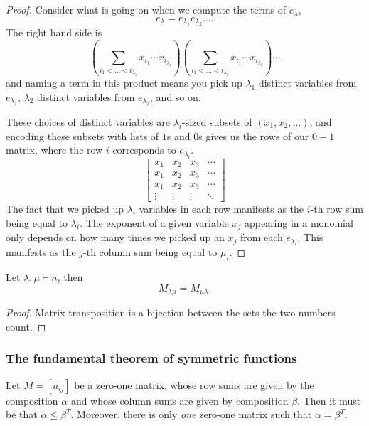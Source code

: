 \documentclass{article}
\begin{document}
\begin{proof}

    Consider what is going on when we compute the terms of $e_\lambda$,
    \[
        e_\lambda = e_{\lambda_1}e_{\lambda_2}\ldots.
    \]
    The right hand side is
    \[
        \left(\sum_{i_1<\ldots<i_{\lambda_1}} x_{i_1}\cdots x_{i_{\lambda_1}}\right)\left(\sum_{i_1<\ldots<i_{\lambda_2}} x_{i_1}\cdots x_{i_{\lambda_2}}\right)\cdots
    \]
    and naming a term in this product means you pick up $\lambda_1$ distinct variables from $e_{\lambda_1}$, $\lambda_2$ distinct variables from $e_{\lambda_2}$, and so on. 
    
    These choices of distinct variables are $\lambda_i$-sized subsets of $(x_1, x_2, \ldots)$, and encoding these subsets with lists of $1$s and $0$s gives us the rows of our $0-1$ matrix, where the row $i$ corresponds to $e_{\lambda_i}$.     
    \[
        \begin{bmatrix}
            x_1 & x_2 & x_3 & \cdots \\
            x_1 & x_2 & x_3 & \cdots \\
            x_1 & x_2 & x_3 & \cdots \\
            \vdots & \vdots & \vdots & \ddots 
        \end{bmatrix}
    \]
    The fact that we picked up $\lambda_i$ variables in each row manifests as the $i$-th row sum being equal to $\lambda_i$.
The exponent of a given variable $x_j$ appearing in a monomial only depends on how many times we picked up an $x_j$ from each $e_{\lambda_i}$. 
This manifests as the $j$-th column sum being equal to $\mu_i$.


\end{proof}

\begin{theorem} \label{thm:e2msymmetric}
    Let $\lambda,\mu \vdash n$, then
    \[
        M_{\lambda\mu} = M_{\mu\lambda}.
    \]
\end{theorem}

\begin{proof}
    Matrix transposition is a bijection between the sets the two numbers count.
\end{proof}

\subsubsection{The fundamental theorem of symmetric functions}
\begin{theorem} \label{thm:galeryser} Let $M = [a_{ij}]$ be a zero-one matrix, whose row sums are given by the composition $\alpha$ and whose column sums are given by composition $\beta$. Then it must be that $\alpha \leq \beta^T$. Moreover, there is only \textit{one} zero-one matrix such that $\alpha = \beta^T$.
\end{theorem}
\end{document}
